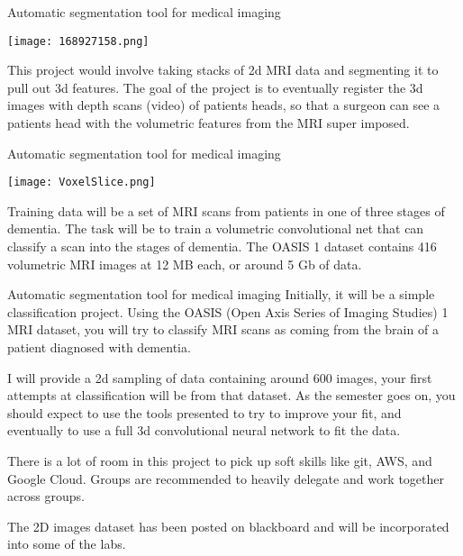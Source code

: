 \documentclass[10pt, handout]{beamer}
\begin{document}
\begin{frame}[fragile]{Automatic segmentation tool for medical imaging }
  \begin{minipage}[t][0.5\textheight][t]{\textwidth}
	\centering \texttt{[image: 168927158.png]} 
  \end{minipage}
  \vfill
\begin{minipage}[t][0.5\textheight][t]{\textwidth}
This project would involve taking stacks of 2d MRI data and segmenting it to pull out 3d features. The goal of the project is to eventually register the 3d images with depth scans (video) of patients heads, so that a surgeon can see a patients head with the volumetric features from the MRI super imposed. 
\end{minipage}
\end{frame}



\begin{frame}[fragile]{Automatic segmentation tool for medical imaging }
  \begin{minipage}[t][0.5\textheight][t]{\textwidth}
	\centering \texttt{[image: VoxelSlice.png]} 
  \end{minipage}
  \vfill
\begin{minipage}[t][0.5\textheight][t]{\textwidth}
Training data will be a set of MRI scans from patients in one of three stages of dementia. The task will be to train a volumetric convolutional net that can classify a scan into the stages of dementia. The OASIS 1 dataset contains 416 volumetric MRI images at 12 MB each, or around 5 Gb of data. 
\end{minipage}
\end{frame}






\begin{frame}[fragile]{Automatic segmentation tool for medical imaging }
Initially, it will be a simple classification project. Using the OASIS (Open Axis Series of Imaging Studies) 1 MRI dataset, you will try to classify MRI scans as coming from the brain of a patient diagnosed with dementia. \pause

I will provide a 2d sampling of data containing around 600 images, your first attempts at classification will be from that dataset. As the semester goes on, you should expect to use the tools presented to try to improve your fit, and eventually to use a full 3d convolutional neural network to fit the data. \pause

There is a lot of room in this project to pick up soft skills like git, AWS, and Google Cloud. Groups are recommended to heavily delegate and work together across groups. \pause

The 2D images dataset has been posted on blackboard and will be incorporated into some of the labs. 
\end{frame}
\end{document}
